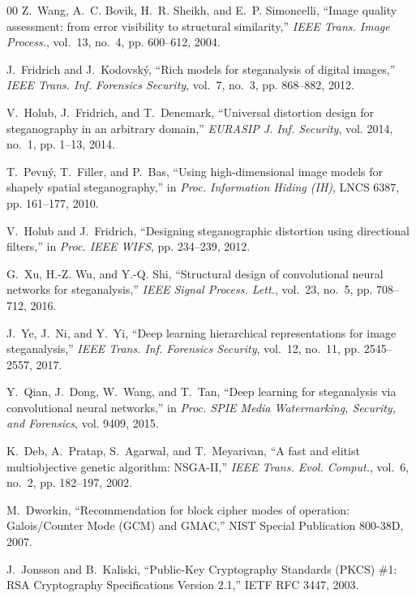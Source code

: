 \documentclass[conference]{IEEEtran}
\begin{document}
\begin{thebibliography}{00}
Z.~Wang, A.~C. Bovik, H.~R. Sheikh, and E.~P. Simoncelli, ``Image quality assessment: from error visibility to structural similarity,'' \emph{IEEE Trans. Image Process.}, vol.~13, no.~4, pp. 600--612, 2004.

J.~Fridrich and J.~Kodovsk{\'y}, ``Rich models for steganalysis of digital images,'' \emph{IEEE Trans. Inf. Forensics Security}, vol.~7, no.~3, pp. 868--882, 2012.

V.~Holub, J.~Fridrich, and T.~Denemark, ``Universal distortion design for steganography in an arbitrary domain,'' \emph{EURASIP J. Inf. Security}, vol. 2014, no.~1, pp. 1--13, 2014.

T.~Pevn{\'y}, T.~Filler, and P.~Bas, ``Using high-dimensional image models for shapely spatial steganography,'' in \emph{Proc. Information Hiding (IH)}, LNCS 6387, pp. 161--177, 2010.

V.~Holub and J.~Fridrich, ``Designing steganographic distortion using directional filters,'' in \emph{Proc. IEEE WIFS}, pp. 234--239, 2012.

G.~Xu, H.-Z. Wu, and Y.-Q. Shi, ``Structural design of convolutional neural networks for steganalysis,'' \emph{IEEE Signal Process. Lett.}, vol.~23, no.~5, pp. 708--712, 2016.

J.~Ye, J.~Ni, and Y.~Yi, ``Deep learning hierarchical representations for image steganalysis,'' \emph{IEEE Trans. Inf. Forensics Security}, vol.~12, no.~11, pp. 2545--2557, 2017.

Y.~Qian, J.~Dong, W.~Wang, and T.~Tan, ``Deep learning for steganalysis via convolutional neural networks,'' in \emph{Proc. SPIE Media Watermarking, Security, and Forensics}, vol. 9409, 2015.

K.~Deb, A.~Pratap, S.~Agarwal, and T.~Meyarivan, ``A fast and elitist multiobjective genetic algorithm: {NSGA-II},'' \emph{IEEE Trans. Evol. Comput.}, vol.~6, no.~2, pp. 182--197, 2002.

M.~Dworkin, ``Recommendation for block cipher modes of operation: {Galois/Counter Mode (GCM)} and {GMAC},'' NIST Special Publication 800-38D, 2007.

J.~Jonsson and B.~Kaliski, ``Public-Key Cryptography Standards ({PKCS}) \#1: {RSA} Cryptography Specifications Version 2.1,'' IETF RFC 3447, 2003.


\end{thebibliography}
\end{document}

